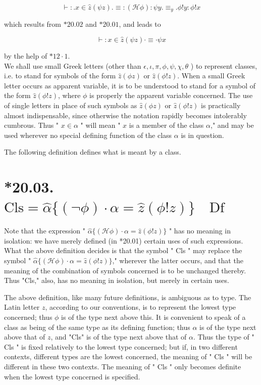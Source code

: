 \documentclass[10pt]{article}
\begin{document}
$$
\vdash: . x \in \hat{z}(\psi z) . \equiv:(\mathcal{H} \phi): \psi y . \equiv_{y} . \phi!y: \phi!x
$$

which results from $* 20.02$ and $* 20.01$, and leads to

$$
\vdash: x \in \hat{z}(\psi z) \cdot \equiv \cdot \psi x
$$

by the help of $* 12 \cdot 1$.\\
We shall use small Greek letters (other than $\epsilon, \iota, \pi, \phi, \psi, \chi, \theta$ ) to represent classes, i.e. to stand for symbols of the form $\hat{z}(\phi z)$ or $\hat{z}(\phi!z)$. When a small Greek letter occurs as apparent variable, it is to be understood to stand for a symbol of the form $\hat{z}(\phi!z)$, where $\phi$ is properly the apparent variable concerned. The use of single letters in place of such symbols as $\hat{z}(\phi z)$ or $\hat{z}(\phi!z)$ is practically almost indispensable, since otherwise the notation rapidly becomes intolerably cumbrous. Thus " $x \in \alpha$ " will mean " $x$ is a member of the class $\alpha$," and may be used wherever no special defining function of the class $\alpha$ is in question.

The following definition defines what is meant by a class.

\section*{*20.03. $\mathrm{Cls}=\hat{\alpha}\{(\neg \phi) \cdot \alpha=\hat{z}(\phi!z)\} \quad \mathrm{Df}$}
Note that the expression " $\hat{\alpha}\{(\mathcal{H} \phi) \cdot \alpha=\hat{z}(\phi!z)\}$ " has no meaning in isolation: we have merely defined (in *20.01) certain uses of such expressions. What the above definition decides is that the symbol " Cls " may replace the symbol " $\hat{\alpha}\{(\mathcal{H} \phi) \cdot \alpha=\hat{z}(\phi!z)\}$," wherever the latter occurs, and that the\\
meaning of the combination of symbols concerned is to be unchanged thereby. Thus "Cls," also, has no meaning in isolation, but merely in certain uses.

The above definition, like many future definitions, is ambiguous as to type. The Latin letter $z$, according to our conventions, is to represent the lowest type concerned; thus $\phi$ is of the type next above this. It is convenient to speak of a class as being of the same type as its defining function; thus $\alpha$ is of the type next above that of $z$, and "Cls" is of the type next above that of $\alpha$. Thus the type of " Cls " is fixed relatively to the lowest type concerned; but if, in two different contexts, different types are the lowest concerned, the meaning of " Cls " will be different in these two contexts. The meaning of " Cls " only becomes definite when the lowest type concerned is specified.
\end{document}
